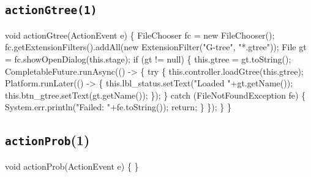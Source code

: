 \subsection{\texttt{actionGtree(1)}}
\nwenddocs{}\endmoddef{}
void actionGtree(ActionEvent e) \{
  FileChooser fc = new FileChooser();
  fc.getExtensionFilters().addAll(new ExtensionFilter("G-tree", "*.gtree"));
  File gt = fc.showOpenDialog(this.stage);
  if (gt != null) \{
    this.gtree = gt.toString();
    CompletableFuture.runAsync(() -> \{
      try \{
        this.controller.loadGtree(this.gtree);
        Platform.runLater(() -> \{
          this.lbl_status.setText("Loaded "+gt.getName());
          this.btn_gtree.setText(gt.getName());
        \});
      \} catch (FileNotFoundException fe) \{
        System.err.println("Failed: "+fe.toString());
        return;
      \}
    \});
  \}
\}
\nwendcode{}\nwdocspar

\subsection{\texttt{actionProb}(1)}
\nwenddocs{}\endmoddef{}
void actionProb(ActionEvent e) \{
\}
\nwendcode{}\nwdocspar

